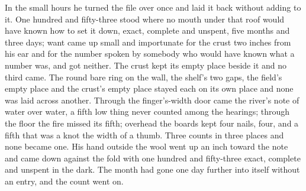 In the small hours he turned the file over once and laid it back without adding to it. One hundred and fifty-three stood where no mouth under that roof would have known how to set it down, exact, complete and unspent, five months and three days; want came up small and importunate for the crust two inches from his ear and for the number spoken by somebody who would have known what a number was, and got neither. The crust kept its empty place beside it and no third came. The round bare ring on the wall, the shelf's two gaps, the field's empty place and the crust's empty place stayed each on its own place and none was laid across another. Through the finger's-width door came the river's note of water over water, a fifth low thing never counted among the hearings; through the floor the fire missed its fifth; overhead the boards kept four nails, four, and a fifth that was a knot the width of a thumb. Three counts in three places and none became one. His hand outside the wool went up an inch toward the note and came down against the fold with one hundred and fifty-three exact, complete and unspent in the dark. The month had gone one day further into itself without an entry, and the count went on.
